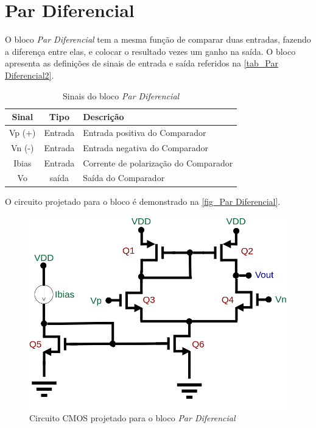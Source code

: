\renewcommand{\NomeBloco}{\emph{Par Diferencial}}
\renewcommand{\NomeBlocoNoIt}{Par Diferencial}
\renewcommand{\NomePTab}{tab_\NomeBlocoNoIt}
\renewcommand{\NomeSTab}{tab_\NomeBlocoNoIt2}
\renewcommand{\NomePFig}{fig_\NomeBlocoNoIt}
\renewcommand{\NomeSFig}{fig_\NomeBlocoNoIt2}
\renewcommand{\NomeTTab}{tab_\NomeBlocoNoIt3}
\renewcommand{\NomeQTab}{tab_\NomeBlocoNoIt4}

\section{Par Diferencial}

O bloco \NomeBloco{} tem a mesma função de comparar duas entradas, fazendo a diferença entre elas, e colocar o resultado vezes um ganho na saída. O bloco apresenta as definições de sinais de entrada e sa\'ida referidos na \autoref{\NomeSTab}.

\begin{table}[htbp]
\caption{Sinais do bloco \NomeBloco}
\label{\NomeSTab}
\centering
\begin{tabular}{ccl}

    \toprule
    Sinal & Tipo    & Descrição        \\
    \midrule \midrule
    Vp (+) & Entrada & Entrada positiva do Comparador\\
    \midrule
    Vn (-) & Entrada & Entrada negativa do Comparador\\
    \midrule
    Ibias & Entrada & Corrente de polarização do Comparador\\
    \midrule
    Vo & sa\'ida & Sa\'ida do Comparador\\
    \bottomrule
\end{tabular}
\end{table}

O circuito projetado para o bloco \'e demonstrado na \autoref{\NomePFig}.

\begin{figure}[htb]
 \centering
    \centering
    \caption{\label{\NomePFig}Circuito CMOS projetado para o bloco \NomeBloco} 
    \includegraphics[scale=0.4]{Circuitos/diff_pair.png}
\end{figure}

